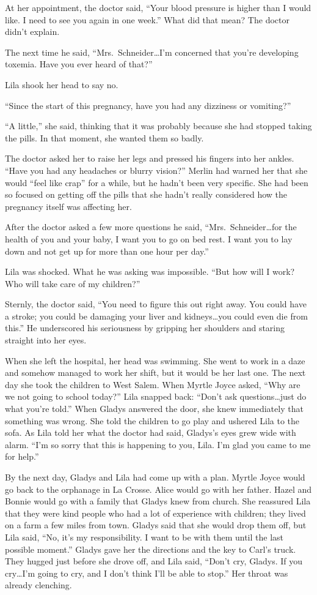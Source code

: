 \documentclass[
  american,
  letterpaper,
]{book}
\begin{document}
At her appointment, the doctor said, ``Your blood pressure is higher
than I would like. I need to see you again in one week.'' What did that
mean? The doctor didn't explain.

The next time he said, ``Mrs.~Schneider\ldots I'm concerned that you're
developing toxemia. Have you ever heard of that?''

Lila shook her head to say no.

``Since the start of this pregnancy, have you had any dizziness or
vomiting?''

``A little,'' she said, thinking that it was probably because she had
stopped taking the pills. In that moment, she wanted them so badly.

The doctor asked her to raise her legs and pressed his fingers into her
ankles. ``Have you had any headaches or blurry vision?'' Merlin had
warned her that she would ``feel like crap'' for a while, but he hadn't
been very specific. She had been so focused on getting off the pills
that she hadn't really considered how the pregnancy itself was affecting
her.

After the doctor asked a few more questions he said,
``Mrs.~Schneider\ldots for the health of you and your baby, I want you
to go on bed rest. I want you to lay down and not get up for more than
one hour per day.''

Lila was shocked. What he was asking was impossible. ``But how will I
work? Who will take care of my children?''

Sternly, the doctor said, ``You need to figure this out right away. You
could have a stroke; you could be damaging your liver and
kidneys\ldots you could even die from this.'' He underscored his
seriousness by gripping her shoulders and staring straight into her
eyes.

When she left the hospital, her head was swimming. She went to work in a
daze and somehow managed to work her shift, but it would be her last
one. The next day she took the children to West Salem. When Myrtle Joyce
asked, ``Why are we not going to school today?'' Lila snapped back:
``Don't ask questions\ldots just do what you're told.'' When Gladys
answered the door, she knew immediately that something was wrong. She
told the children to go play and ushered Lila to the sofa. As Lila told
her what the doctor had said, Gladys's eyes grew wide with alarm. ``I'm
so sorry that this is happening to you, Lila. I'm glad you came to me
for help.''

By the next day, Gladys and Lila had come up with a plan. Myrtle Joyce
would go back to the orphanage in La Crosse. Alice would go with her
father. Hazel and Bonnie would go with a family that Gladys knew from
church. She reassured Lila that they were kind people who had a lot of
experience with children; they lived on a farm a few miles from town.
Gladys said that she would drop them off, but Lila said, ``No, it's my
responsibility. I want to be with them until the last possible moment.''
Gladys gave her the directions and the key to Carl's truck. They hugged
just before she drove off, and Lila said, ``Don't cry, Gladys. If you
cry\ldots I'm going to cry, and I don't think I'll be able to stop.''
Her throat was already clenching.
\end{document}
